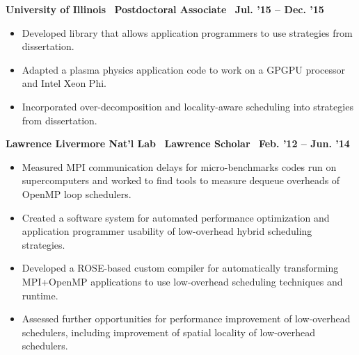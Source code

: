 \textbf{ University of Illinois$\>$$\>$$\>$$\>$Postdoctoral Associate$\>$$\>$$\>$$\>$Jul. '15 – Dec. '15}
\vspace*{-0.0in}
\begin{itemize} 
\item Developed library that allows application programmers to use strategies from dissertation.
\item Adapted a plasma physics application code to work on a
GPGPU processor and Intel Xeon Phi.
\item Incorporated over-decomposition and locality-aware scheduling into strategies from dissertation.
\end{itemize}

\textbf{Lawrence Livermore Nat’l Lab$\>$$\>$$\>$$\>$Lawrence Scholar$\>$$\>$$\>$$\>$Feb. '12 – Jun. '14}
\vspace*{-0.0in}
\begin{itemize} 
\item Measured MPI communication delays for micro-benchmarks codes run on supercomputers and worked to find tools to measure dequeue overheads of OpenMP loop schedulers.
\item Created a software system for automated performance optimization and application programmer usability of low-overhead hybrid scheduling
strategies.
\item Developed a ROSE-based custom compiler for automatically transforming MPI+OpenMP applications to use low-overhead scheduling
techniques and runtime.
\item Assessed further opportunities for performance improvement of low-overhead schedulers, including improvement of spatial locality
of low-overhead schedulers.
\end{itemize}
